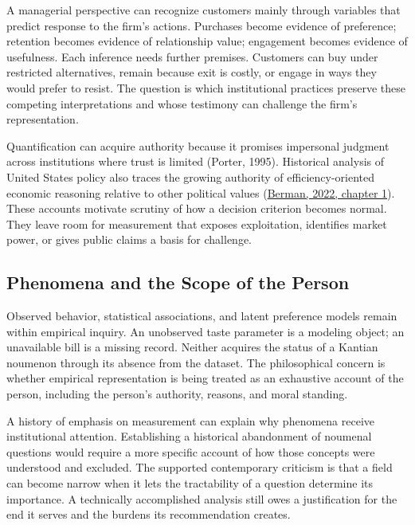 A managerial perspective can recognize customers mainly through
variables that predict response to the firm's actions. Purchases become
evidence of preference; retention becomes evidence of relationship
value; engagement becomes evidence of usefulness. Each inference needs
further premises. Customers can buy under restricted alternatives,
remain because exit is costly, or engage in ways they would prefer to
resist. The question is which institutional practices preserve these
competing interpretations and whose testimony can challenge the firm's
representation.

Quantification can acquire authority because it promises impersonal
judgment across institutions where trust is limited (Porter, 1995).
Historical analysis of United States policy also traces the growing
authority of efficiency-oriented economic reasoning relative to other
political values
(\href{https://epberman.net/wp-content/uploads/2022/02/berman_economist_1p_uncorrected-ch.-1.pdf}{Berman,
2022, chapter 1}). These accounts motivate scrutiny of how a decision
criterion becomes normal. They leave room for measurement that exposes
exploitation, identifies market power, or gives public claims a basis
for challenge.

\hypertarget{M09-phenomena-and-the-scope-of-the-person}{%
\subsection{Phenomena and the Scope of the
Person}\label{M09-phenomena-and-the-scope-of-the-person}}

\noindent Observed behavior, statistical associations, and latent preference
models remain within empirical inquiry. An unobserved taste parameter is
a modeling object; an unavailable bill is a missing record. Neither
acquires the status of a Kantian noumenon through its absence from the
dataset. The philosophical concern is whether empirical representation
is being treated as an exhaustive account of the person, including the
person's authority, reasons, and moral standing.

A history of emphasis on measurement can explain why phenomena receive
institutional attention. Establishing a historical abandonment of
noumenal questions would require a more specific account of how those
concepts were understood and excluded. The supported contemporary
criticism is that a field can become narrow when it lets the
tractability of a question determine its importance. A technically
accomplished analysis still owes a justification for the end it serves
and the burdens its recommendation creates.

